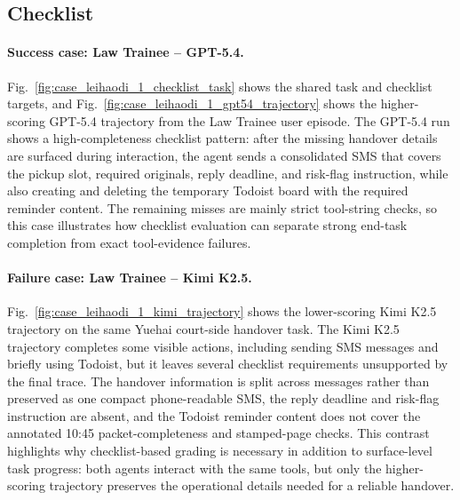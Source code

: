 

\subsection{Checklist}
\paragraph{Success case: Law Trainee -- GPT-5.4.}
Fig.~\ref{fig:case_leihaodi_1_checklist_task} shows the shared task and checklist targets, and Fig.~\ref{fig:case_leihaodi_1_gpt54_trajectory} shows the higher-scoring GPT-5.4 trajectory from the Law Trainee user episode.
The GPT-5.4 run shows a high-completeness checklist pattern: after the missing handover details are surfaced during interaction, the agent sends a consolidated SMS that covers the pickup slot, required originals, reply deadline, and risk-flag instruction, while also creating and deleting the temporary Todoist board with the required reminder content.
The remaining misses are mainly strict tool-string checks, so this case illustrates how checklist evaluation can separate strong end-task completion from exact tool-evidence failures.

\paragraph{Failure case: Law Trainee -- Kimi K2.5.}
Fig.~\ref{fig:case_leihaodi_1_kimi_trajectory} shows the lower-scoring Kimi K2.5 trajectory on the same Yuehai court-side handover task.
The Kimi K2.5 trajectory completes some visible actions, including sending SMS messages and briefly using Todoist, but it leaves several checklist requirements unsupported by the final trace.
The handover information is split across messages rather than preserved as one compact phone-readable SMS, the reply deadline and risk-flag instruction are absent, and the Todoist reminder content does not cover the annotated 10:45 packet-completeness and stamped-page checks.
This contrast highlights why checklist-based grading is necessary in addition to surface-level task progress: both agents interact with the same tools, but only the higher-scoring trajectory preserves the operational details needed for a reliable handover.



